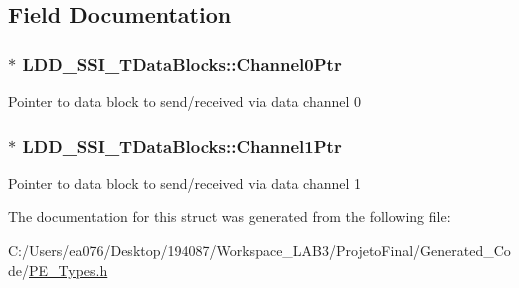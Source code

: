\subsection{Field Documentation}
\hypertarget{struct_l_d_d___s_s_i___t_data_blocks_a8b1b9f1fd6075f9d9975f1506ac64a16}{
\subsubsection[{Channel0\-Ptr}]{$\ast$ L\-D\-D\-\_\-\-S\-S\-I\-\_\-\-T\-Data\-Blocks\-::\-Channel0\-Ptr}}\label{struct_l_d_d___s_s_i___t_data_blocks_a8b1b9f1fd6075f9d9975f1506ac64a16}
Pointer to data block to send/received via data channel 0 \hypertarget{struct_l_d_d___s_s_i___t_data_blocks_a5c0e65fe82f88a245123217769316fef}{
\subsubsection[{Channel1\-Ptr}]{$\ast$ L\-D\-D\-\_\-\-S\-S\-I\-\_\-\-T\-Data\-Blocks\-::\-Channel1\-Ptr}}\label{struct_l_d_d___s_s_i___t_data_blocks_a5c0e65fe82f88a245123217769316fef}
Pointer to data block to send/received via data channel 1 

The documentation for this struct was generated from the following file\-:\begin{DoxyCompactItemize}
\item 
C\-:/\-Users/ea076/\-Desktop/194087/\-Workspace\-\_\-\-L\-A\-B3/\-Projeto\-Final/\-Generated\-\_\-\-Code/\hyperlink{_p_e___types_8h}{P\-E\-\_\-\-Types.\-h}\end{DoxyCompactItemize}
